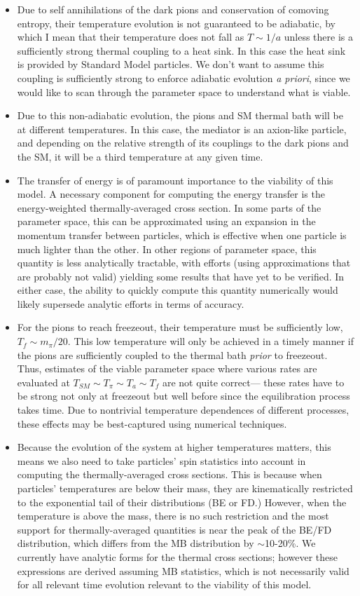 \documentclass[superscriptaddress,nofootinbib,notitlepage,onecolumn]{revtex4-1}
\begin{document}
\begin{itemize}
\item Due to self annihilations of the dark pions and conservation of comoving entropy, their temperature evolution is not guaranteed to be adiabatic, by which I mean that their temperature does not fall as $T\sim 1/a$ unless there is a sufficiently strong thermal coupling to a heat sink. In this case the heat sink is provided by Standard Model particles. We don't want to assume this coupling is sufficiently strong to enforce adiabatic evolution \emph{a priori}, since we would like to scan through the parameter space to understand what is viable.
\item Due to this non-adiabatic evolution, the pions and SM thermal bath will be at different temperatures. In this case, the mediator is an axion-like particle, and depending on the relative strength of its couplings to the dark pions and the SM, it will be a third temperature at any given time.
\item The transfer of energy is of paramount importance to the viability of this model. A necessary component for computing the  energy transfer is the energy-weighted thermally-averaged cross section. In some parts of the parameter space, this can be approximated using an expansion in the momentum transfer between particles, which is effective when one particle is much lighter than the other. In other regions of parameter space, this quantity is less analytically tractable, with efforts (using approximations that are probably not valid) yielding some results that have yet to be verified. In either case, the ability to quickly compute this quantity numerically would likely supersede analytic efforts in terms of accuracy.
\item For the pions to reach freezeout, their temperature must be sufficiently low, $T_f \sim m_\pi/20$. This low temperature will only be achieved in a timely manner if the pions are sufficiently coupled to the thermal bath \emph{prior} to freezeout. Thus, estimates of the viable parameter space where various rates are evaluated at $T_{SM}\sim T_\pi\sim T_a\sim T_f$ are not quite correct--- these rates have to be strong not only at freezeout but well before since the equilibration process takes time. Due to nontrivial temperature dependences of different processes, these effects may be best-captured using numerical techniques.
\item Because the evolution of the system at higher temperatures matters, this means we also need to take particles' spin statistics into account in computing the thermally-averaged cross sections. This is because when particles' temperatures are below their mass, they are kinematically restricted to the exponential tail of their distributions (BE or FD.) However, when the temperature is above the mass, there is no such restriction and the most support for thermally-averaged quantities is near the peak of the BE/FD distribution, which differs from the MB distribution by $\sim$10-20\%. We currently have analytic forms for the thermal cross sections; however these expressions are derived assuming MB statistics, which is not necessarily valid for all relevant time evolution relevant to the viability of this model.
\end{itemize}
\end{document}
